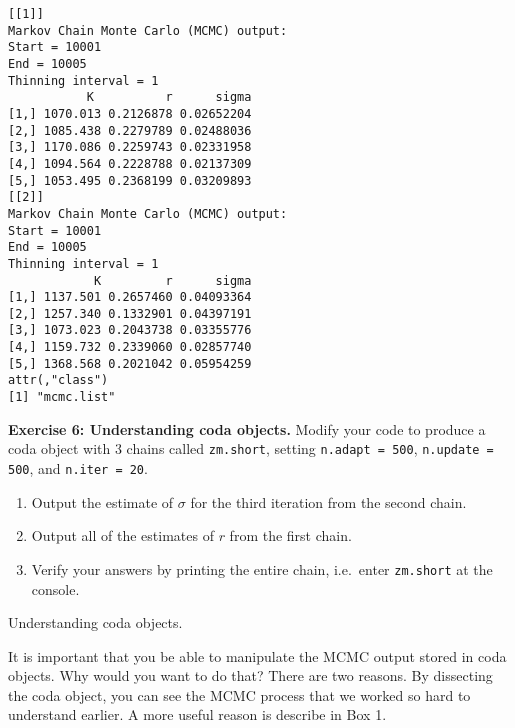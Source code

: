 \documentclass[12pt,english]{article}
\begin{document}
\begin{Verbatim}[fontsize=\small]
[[1]]
Markov Chain Monte Carlo (MCMC) output:
Start = 10001
End = 10005
Thinning interval = 1
           K          r      sigma
[1,] 1070.013 0.2126878 0.02652204
[2,] 1085.438 0.2279789 0.02488036
[3,] 1170.086 0.2259743 0.02331958
[4,] 1094.564 0.2228788 0.02137309
[5,] 1053.495 0.2368199 0.03209893
[[2]]
Markov Chain Monte Carlo (MCMC) output:
Start = 10001
End = 10005
Thinning interval = 1
            K         r      sigma
[1,] 1137.501 0.2657460 0.04093364
[2,] 1257.340 0.1332901 0.04397191
[3,] 1073.023 0.2043738 0.03355776
[4,] 1159.732 0.2339060 0.02857740
[5,] 1368.568 0.2021042 0.05954259
attr(,"class")
[1] "mcmc.list"
\end{Verbatim}

\belowcaptionskip=-30pt
\begin{exercise}
\begin{mdframed}
\doublespacing
\textbf{Exercise 6: Understanding coda objects.} Modify your code to produce a coda object with 3 chains called \texttt{zm.short}, setting \texttt{n.adapt = 500}, \texttt{n.update = 500}, and \texttt{n.iter = 20}.
\begin{enumerate}
\item Output the estimate of $\sigma$ for the third iteration from the second chain.
\item Output all of the estimates of $r$ from the first chain.
\item Verify your answers by printing the entire chain, i.e.\ enter \texttt{zm.short} at the console.
\end{enumerate}
\end{mdframed}
\captionsetup{textformat=empty, labelformat=empty}
\caption[Understanding coda objects]{Understanding coda objects.}
\label{ex:coda understanding}
\end{exercise}
\belowcaptionskip=0pt

It is important that you be able to manipulate the MCMC output stored in coda objects. Why would you want to do that? There are two reasons. By dissecting the coda object, you can see the MCMC process that we worked so hard to understand earlier. A more useful reason is describe in Box 1.

\newpage 
\end{document}
